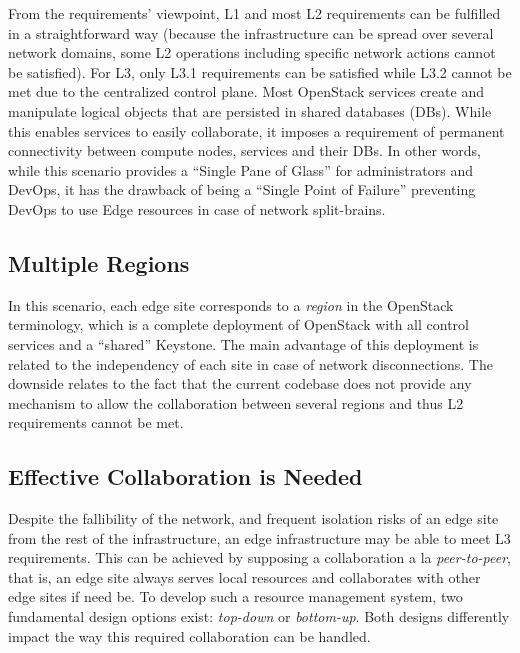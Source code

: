 From the requirements' viewpoint, L1 and most L2 requirements can be
fulfilled in a straightforward way (because the infrastructure can be
spread over several network domains, some L2 operations including
specific network actions cannot be satisfied). For L3, only L3.1
requirements can be satisfied while L3.2  cannot be met due to
the centralized control plane. Most OpenStack services create and
manipulate logical objects that are persisted in shared databases
(DBs). While this enables services to easily collaborate, it imposes
a requirement of permanent connectivity between compute nodes, services and their
DBs.  In other words, while this scenario provides a ``Single Pane of
Glass'' for administrators and DevOps, it has the drawback of being a
``Single Point of Failure'' preventing DevOps to use Edge resources in
case of network split-brains.

\subsection{Multiple Regions}
In this scenario, each edge site corresponds to a \emph{region}
in the OpenStack terminology, which is a complete deployment of
OpenStack with all control services and a ``shared'' Keystone.
The main advantage of this deployment is related to the independency
of each site in case of network disconnections.
The downside relates to the fact that the current codebase does not
provide any mechanism to allow the collaboration between several
regions and thus L2 requirements cannot be met.~


\subsection{Effective Collaboration is Needed}
Despite the fallibility of the network, and frequent isolation risks
of an edge site from the rest of the infrastructure, an edge
infrastructure may be able to meet L3 requirements. This can be
achieved by supposing a collaboration a la \emph{peer-to-peer},
that is, an edge site always serves local resources and collaborates
with other edge sites if need be. To develop such a resource
management system, two fundamental design options exist:
\emph{top-down} or \emph{bottom-up}. Both designs differently impact the way
this required collaboration can be handled.

